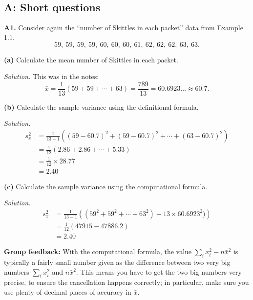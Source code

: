 \documentclass[
  a4paper,
]{book}
\theoremstyle{definition}
\theoremstyle{definition}
\theoremstyle{definition}
\theoremstyle{definition}
\theoremstyle{remark}
\begin{document}
\hypertarget{P1-short-solutions}{%
\subsection*{A: Short questions}\label{P1-short-solutions}}

\textbf{A1.} Consider again the ``number of Skittles in each packet'' data from Example 1.1.
\[ 59, \ 59, \ 59, \ 59, \ 60, \ 60, \ 60, \ 61, \ 62, \ 62, \ 62, \ 63, \ 63 .\]

\textbf{(a)} Calculate the mean number of Skittles in each packet.

\begin{myanswers}
\emph{Solution.} This was in the notes:
\[ \bar x = \frac{1}{13} (59 + 59 + \cdots + 63) =  \frac{789}{13} = 60.6923\dots \approx 60.7 .\]

\end{myanswers}

\textbf{(b)} Calculate the sample variance using the definitional
formula.

\begin{myanswers}
\emph{Solution.}
\begin{align*}
s_x^2 &= \frac{1}{13 - 1} \left( (59 - 60.7)^2 + (59 - 60.7)^2 + \cdots + (63 - 60.7)^2 \right) \\
      &= \frac{1}{12} (2.86 + 2.86 + \cdots + 5.33) \\
      &= \frac{1}{12} \times 28.77 \\
      &= 2.40
\end{align*}

\end{myanswers}

\textbf{(c)} Calculate the sample variance using the computational formula.

\begin{myanswers}
\emph{Solution.}
\begin{align*}
s_x^2 &= \frac{1}{13 - 1} \left( (59^2 + 59^2 + \cdots + 63^2) - 13 \times 60.6923^2)\right) \\
      &= \frac{1}{12} (47915 - 47886.2) \\
      &= 2.40
\end{align*}

\textbf{Group feedback:} With the computational formula, the value \(\sum_i x_i^2 - n \bar{x}^2\) is typically a fairly small number given as the difference between two very big numbers \(\sum_i x_i^2\) and \(n \bar x^2\). This means you have to get the two big numbers very precise, to ensure the cancellation happens correctly; in particular, make sure you use plenty of decimal places of accuracy in \(\bar x\).

\end{myanswers}
\end{document}
